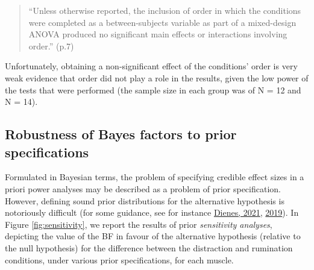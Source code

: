 \documentclass[
  man, donotrepeattitle,floatsintext]{apa6}
\begin{document}
\begin{quote}
``Unless otherwise reported, the inclusion of order in which the conditions were completed as a between-subjects variable as part of a mixed-design ANOVA produced no significant main effects or interactions involving order.'' (p.7)
\end{quote}

Unfortunately, obtaining a non-significant effect of the conditions' order is very weak evidence that order did not play a role in the results, given the low power of the tests that were performed (the sample size in each group was of N = 12 and N = 14).

\hypertarget{robustness-of-bayes-factors-to-prior-specifications}{%
\subsection{Robustness of Bayes factors to prior specifications}\label{robustness-of-bayes-factors-to-prior-specifications}}

Formulated in Bayesian terms, the problem of specifying credible effect sizes in a priori power analyses may be described as a problem of prior specification. However, defining sound prior distributions for the alternative hypothesis is notoriously difficult (for some guidance, see for instance \protect\hyperlink{ref-dienes_obtaining_2021}{Dienes, 2021}, \protect\hyperlink{ref-dienes_how_2019}{2019}). In Figure \ref{fig:sensitivity}, we report the results of prior \emph{sensitivity analyses}, depicting the value of the BF in favour of the alternative hypothesis (relative to the null hypothesis) for the difference between the distraction and rumination conditions, under various prior specifications, for each muscle.
\end{document}
